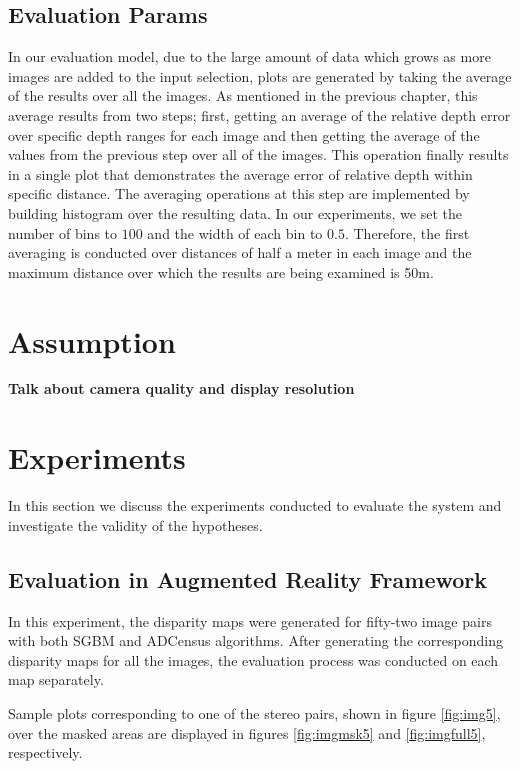 \subsection{Evaluation Params}
In our evaluation model, due to the large amount of data which grows as more images are added to the input selection, 
plots are generated by taking the average of the results over all the images. As mentioned in the previous chapter, this average results from two steps; 
first, getting an average of the relative depth error over specific
depth ranges for each image and then getting the average of the values from the previous step over all of the images. This operation finally results in a single plot
that demonstrates the average error of relative depth within specific distance.
The averaging operations at this step are implemented by building histogram over the resulting data. 
In our experiments, we set the number of bins to $100$ and the width of each bin to $0.5$. Therefore, the first averaging is conducted over distances of half a meter in each image and the maximum distance over which the results are 
being examined is 50m.

\section{Assumption}
\textbf{Talk about camera quality and display resolution}

\section{Experiments}
In this section we discuss the experiments conducted to evaluate the system and investigate the validity of the hypotheses.

\subsection{Evaluation in Augmented Reality Framework}

In this experiment, the disparity maps 
were generated for fifty-two image pairs with both SGBM and ADCensus algorithms. 
After generating the corresponding disparity maps for all the images, 
the evaluation process was conducted on each map separately.

Sample plots corresponding to one of the stereo pairs, shown in figure \ref{fig:img5},
over the masked areas are displayed in figures \ref{fig:imgmsk5} and \ref{fig:imgfull5}, respectively.

